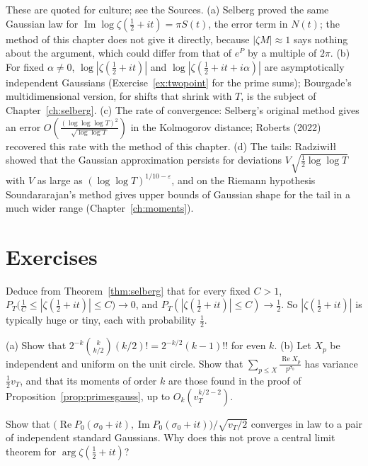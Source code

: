 \begin{remark}
These are quoted for culture; see the Sources. (a) Selberg proved the same Gaussian law for $\operatorname{Im}\log\zeta(\frac12+it)=\pi S(t)$, the error term in $N(t)$; the method of this chapter does not give it directly, because $|\zeta M|\approx1$ says nothing about the argument, which could differ from that of $e^P$ by a multiple of $2\pi$. (b) For fixed $\alpha\ne0$, $\log|\zeta(\frac12+it)|$ and $\log|\zeta(\frac12+it+i\alpha)|$ are asymptotically independent Gaussians (Exercise~\ref{ex:twopoint} for the prime sums); Bourgade's multidimensional version, for shifts that shrink with $T$, is the subject of Chapter~\ref{ch:selberg}. (c) The rate of convergence: Selberg's original method gives an error $O(\frac{(\log\log\log T)^2}{\sqrt{\log\log T}})$ in the Kolmogorov distance; Roberts (2022) recovered this rate with the method of this chapter. (d) The tails: Radziwi\l\l{} showed that the Gaussian approximation persists for deviations $V\sqrt{\frac12\log\log T}$ with $V$ as large as $(\log\log T)^{1/10-\varepsilon}$, and on the Riemann hypothesis Soundararajan's method gives upper bounds of Gaussian shape for the tail in a much wider range (Chapter~\ref{ch:moments}).
\end{remark}

\section{Exercises}

\begin{exercise}[$\star$]\label{ex:typical}
Deduce from Theorem~\ref{thm:selberg} that for every fixed $C>1$, $P_T\bigl(\frac1C\le|\zeta(\frac12+it)|\le C\bigr)\to0$, and $P_T(|\zeta(\frac12+it)|\le C)\to\frac12$. So $|\zeta(\frac12+it)|$ is typically huge or tiny, each with probability $\frac12$.
\end{exercise}

\begin{exercise}[$\star$]\label{ex:half}
(a) Show that $2^{-k}\binom k{k/2}(k/2)!=2^{-k/2}(k-1)!!$ for even $k$. (b) Let $X_p$ be independent and uniform on the unit circle. Show that $\sum_{p\le X}\frac{\operatorname{Re}X_p}{p^{\sigma_0}}$ has variance $\frac12v_T$, and that its moments of order $k$ are those found in the proof of Proposition~\ref{prop:primesgauss}, up to $O_k(v_T^{k/2-2})$.
\end{exercise}

\begin{exercise}[$\star\star$]\label{ex:complexgauss}
Show that $\bigl(\operatorname{Re}P_0(\sigma_0+it),\operatorname{Im}P_0(\sigma_0+it)\bigr)/\sqrt{v_T/2}$ converges in law to a pair of independent standard Gaussians. Why does this not prove a central limit theorem for $\arg\zeta(\frac12+it)$?
\end{exercise}


